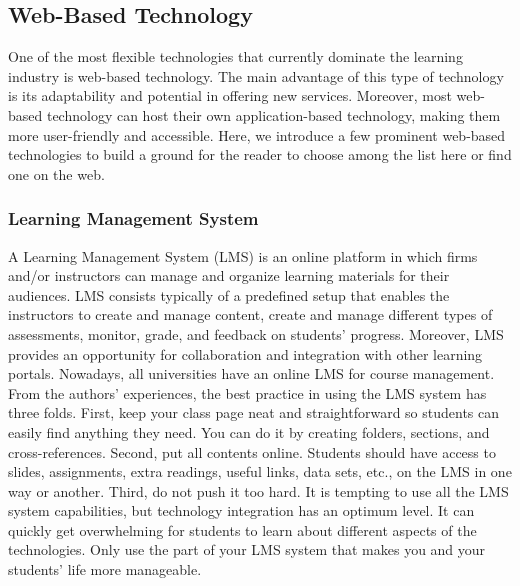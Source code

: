 \documentclass{book}
\begin{document}
\hypertarget{web-based-technology}{%
\subsection{Web-Based Technology}\label{web-based-technology}}

One of the most flexible technologies that currently dominate the learning
industry is web-based technology. The main advantage of this type of
technology is its adaptability and potential in offering new services.
Moreover, most web-based technology can host their own application-based
technology, making them more user-friendly and accessible. Here, we introduce
a few prominent web-based technologies to build a ground for the reader to
choose among the list here or find one on the web.

\hypertarget{learning-management-system}{%
\subsubsection{Learning Management System}\label{learning-management-system}}

A Learning Management System (LMS) is an online platform in which firms and/or
instructors can manage and organize learning materials for their audiences.
LMS consists typically of a predefined setup that enables the instructors to
create and manage content, create and manage different types of assessments,
monitor, grade, and feedback on students' progress. Moreover, LMS provides an
opportunity for collaboration and integration with other learning portals.
Nowadays, all universities have an online LMS for course management. From the
authors' experiences, the best practice in using the LMS system has three
folds. First, keep your class page neat and straightforward so students can
easily find anything they need. You can do it by creating folders, sections,
and cross-references. Second, put all contents online. Students should have
access to slides, assignments, extra readings, useful links, data sets, etc.,
on the LMS in one way or another. Third, do not push it too hard. It is
tempting to use all the LMS system capabilities, but technology integration
has an optimum level. It can quickly get overwhelming for students to learn
about different aspects of the technologies. Only use the part of your LMS
system that makes you and your students' life more manageable.
\end{document}
